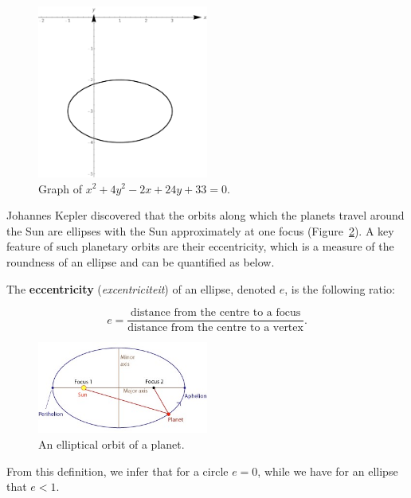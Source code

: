 \begin{example}
\begin{figure}[H]
	\begin{center}
			\includegraphics[width=0.5\textwidth]{fig_algebraic_23}
	\caption{Graph of $x^2+4y^2-2x+24y+33 = 0$.}
	\label{fig_algebraic_23}
	\end{center}
\end{figure}
\vspace*{-0.5cm}
\end{example}

\ifcourse
Johannes Kepler discovered that the orbits along which the planets travel around the Sun are ellipses with the Sun approximately at one focus (Figure~\ref{fig_algebraic_24}). A key feature of such planetary orbits are their eccentricity, which is a measure of the roundness of an ellipse and can be 
 quantified as below.

\begin{definition}[Eccentricity]

The \label{ellipseeccentricity}  \textbf{eccentricity} (\textit{excentriciteit}) of an ellipse, denoted $e$, is the following ratio:

\[  e = \dfrac{\mbox{distance from the centre to a focus}}{\mbox{distance from the centre to a vertex}}. \]

\end{definition}

\begin{figure}
	\begin{center}
			\includegraphics[width=0.5\textwidth]{fig_algebraic_24}
	\caption{An elliptical orbit of a planet.}
	\label{fig_algebraic_24}
	\end{center}
\end{figure}
From this definition, we infer that for a circle $e=0$, while we have for an ellipse that $e<1$.


